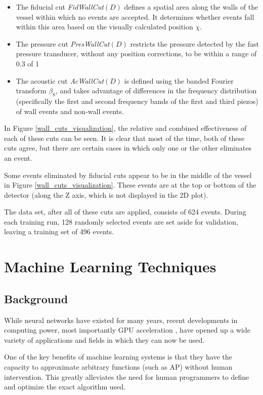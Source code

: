 \documentclass[10pt]{article}
\begin{document}
\begin{itemize}
    \item The fiducial cut {\it FidWallCut}$(D)$ defines a spatial area along the walls of the vessel within which no events are accepted. It determines whether events fall within this area based on the visually calculated position $\chi$.
    \item The pressure cut {\it PresWallCut}$(D)$ restricts the pressure detected by the fast pressure transducer, without any position corrections, to be within a range of 0.3 of 1
    \item The acoustic cut {\it AcWallCut}$(D)$ is defined using the banded Fourier transform $\beta_{8}$, and takes advantage of differences in the frequency distribution (specifically the first and second frequency bands of the first and third piezos) of wall events and non-wall events.
\end{itemize}

In Figure \ref{wall_cuts_visualization}, the relative and combined effectiveness of each of these cuts can be seen. It is clear that most of the time, both of these cuts agree, but there are certain cases in which only one or the other eliminates an event.

Some events eliminated by fiducial cuts appear to be in the middle of the vessel in Figure \ref{wall_cuts_visualization}. These events are at the top or bottom of the detector (along the Z axis, which is not displayed in the 2D plot).

The data set, after all of these cuts are applied, consists of 624 events. During each training run, 128 randomly selected events are set aside for validation, leaving a training set of 496 events.

\section{Machine Learning Techniques}

\subsection{Background}

While neural networks have existed for many years, recent developments in computing power, most importantly GPU acceleration \cite{gpu}, have opened up a wide variety of applications and fields in which they can now be used.

One of the key benefits of machine learning systems is that they have the capacity to approximate arbitrary functions (such as AP) without human intervention. This greatly alleviates the need for human programmers to define and optimize the exact algorithm used.
\end{document}
